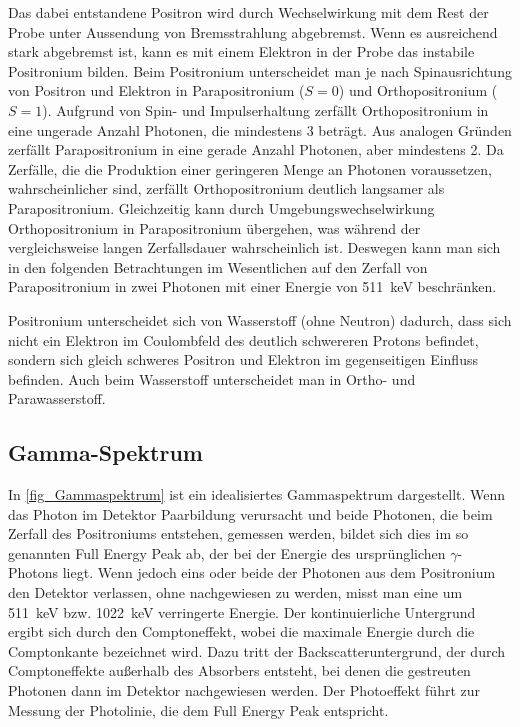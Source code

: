 \documentclass[
	a4paper,
	12pt,
	pagesize,
	ngerman
]{scrartcl}
\begin{document}
	Das dabei entstandene Positron wird durch Wechselwirkung mit dem Rest der Probe unter Aussendung von Bremsstrahlung abgebremst.
	Wenn es ausreichend stark abgebremst ist, kann es mit einem Elektron in der Probe das instabile Positronium bilden.
	Beim Positronium unterscheidet man je nach Spinausrichtung von Positron und Elektron in Parapositronium ($S=0$) und Orthopositronium ($S=1$).
	Aufgrund von Spin- und Impulserhaltung zerfällt Orthopositronium in eine ungerade Anzahl Photonen, die mindestens \num{3} beträgt.
	Aus analogen Gründen zerfällt Parapositronium in eine gerade Anzahl Photonen, aber mindestens \num{2}.
	Da Zerfälle, die die Produktion einer geringeren Menge an Photonen voraussetzen, wahrscheinlicher sind, zerfällt Orthopositronium deutlich langsamer als Parapositronium.
	Gleichzeitig kann durch Umgebungswechselwirkung Orthopositronium in Parapositronium übergehen, was während der vergleichsweise langen Zerfallsdauer wahrscheinlich ist.
	Deswegen kann man sich in den folgenden Betrachtungen im Wesentlichen auf den Zerfall von Parapositronium in zwei Photonen mit einer Energie von \SI{511}{keV} beschränken.

	Positronium unterscheidet sich von Wasserstoff (ohne Neutron) dadurch, dass sich nicht ein Elektron im Coulombfeld des deutlich schwereren Protons befindet, sondern sich gleich schweres Positron und Elektron im gegenseitigen Einfluss befinden.
	Auch beim Wasserstoff unterscheidet man in Ortho- und Parawasserstoff.

	\subsection{Gamma-Spektrum}

		In \cref{fig_Gammaspektrum} ist ein idealisiertes Gammaspektrum dargestellt.
		Wenn das Photon im Detektor Paarbildung verursacht und beide Photonen, die beim Zerfall des Positroniums entstehen, gemessen werden, bildet sich dies im so genannten Full Energy Peak ab, der bei der Energie des ursprünglichen $\gamma$-Photons liegt.
		Wenn jedoch eins oder beide der Photonen aus dem Positronium den Detektor verlassen, ohne nachgewiesen zu werden, misst man eine um \SI{511}{keV} bzw. \SI{1022}{keV} verringerte Energie.
		Der kontinuierliche Untergrund ergibt sich durch den Comptoneffekt, wobei die maximale Energie durch die Comptonkante bezeichnet wird.
		Dazu tritt der Backscatteruntergrund, der durch Comptoneffekte außerhalb des Absorbers entsteht, bei denen die gestreuten Photonen dann im Detektor nachgewiesen werden.
		Der Photoeffekt führt zur Messung der Photolinie, die dem Full Energy Peak entspricht.
\end{document}
